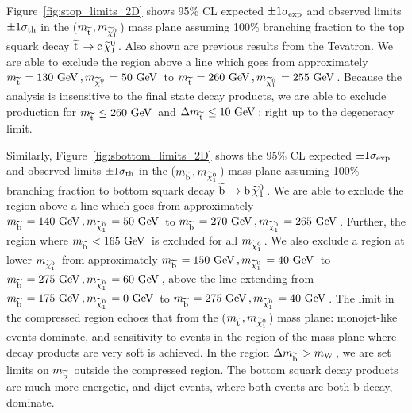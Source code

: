 Figure~\ref{fig:stop_limits_2D} shows 95\% CL expected $\pm 1 \sigma_{\rm exp}$ and observed limits $\pm 1 \sigma_{\rm th}$ in the ($m_{\widetilde{{\rm t}}\,},m_{\widetilde{\chi}^{0}_{1}\,}$) mass plane assuming 100\% branching fraction to the top squark decay $\widetilde{{\rm t}}\, \rightarrow {\rm c}\, \widetilde{\chi}^{0}_{1}\,$.
Also shown are previous results from the Tevatron.
We are able to exclude the region above a line which goes from approximately $m_{\widetilde{{\rm t}}\,}=130~\mathrm{GeV}\,, m_{\widetilde{\chi}^{0}_{1}\,}=50~\mathrm{GeV}\,$ to $m_{\widetilde{{\rm t}}\,}=260~\mathrm{GeV}\,, m_{\widetilde{\chi}^{0}_{1}\,}=255~\mathrm{GeV}\,$.  
Because the analysis is insensitive to the final state decay products, we are able to exclude \ttwocc production for $m_{\widetilde{{\rm t}}\,} \leq 260~\mathrm{GeV}\,$ and $\Delta m_{\widetilde{{\rm t}}\,} \leq 10~\mathrm{GeV}\,$: right up to the degeneracy limit. 

Similarly, Figure~\ref{fig:sbottom_limits_2D} shows the 95\% CL expected $\pm 1 \sigma_{\rm exp}$ and observed limits $\pm 1 \sigma_{\rm th}$ in the ($m_{\widetilde{{\rm b}}\,},m_{\widetilde{\chi}^{0}_{1}\,}$) mass plane assuming 100\% branching fraction to bottom squark decay $\widetilde{{\rm b}}\, \rightarrow {\rm b}\, \widetilde{\chi}^{0}_{1}\,$.
We are able to exclude the region above a line which goes from approximately $m_{\widetilde{{\rm b}}\,}=140~\mathrm{GeV}\,, m_{\widetilde{\chi}^{0}_{1}\,}=50~\mathrm{GeV}\,$ to $m_{\widetilde{{\rm b}}\,}=270~\mathrm{GeV}\,, m_{\widetilde{\chi}^{0}_{1}\,}=265~\mathrm{GeV}\,$.  
Further, the region where $m_{\widetilde{{\rm b}}\,} < 165~\mathrm{GeV}\,$ is excluded for all $m_{\widetilde{\chi}^{0}_{1}\,}$.
We also exclude a region at lower $m_{\widetilde{\chi}^{0}_{1}\,}$ from approximately $m_{\widetilde{{\rm b}}\,}=150~\mathrm{GeV}\,, m_{\widetilde{\chi}^{0}_{1}\,}=40~\mathrm{GeV}\,$ to $m_{\widetilde{{\rm b}}\,}=275~\mathrm{GeV}\,, m_{\widetilde{\chi}^{0}_{1}\,}=60~\mathrm{GeV}\,$, above the line extending from $m_{\widetilde{{\rm b}}\,}=175~\mathrm{GeV}\,, m_{\widetilde{\chi}^{0}_{1}\,}=0~\mathrm{GeV}\,$ to $m_{\widetilde{{\rm b}}\,}=275~\mathrm{GeV}\,, m_{\widetilde{\chi}^{0}_{1}\,}=40~\mathrm{GeV}\,$.
The limit in the compressed region echoes that from the ($m_{\widetilde{{\rm t}}\,},m_{\widetilde{\chi}^{0}_{1}\,}$) mass plane: monojet-like events dominate, and sensitivity to events in the region of the mass plane where decay products are very soft is achieved. 
In the region $\Delta m_{\widetilde{{\rm b}}\,}>m_{\mathrm{W}\,}$, we are set limits on $m_{\widetilde{{\rm b}}\,}$ outside the compressed region. The bottom squark decay products are much more energetic, and dijet events, where both events are both b decay, dominate. 



